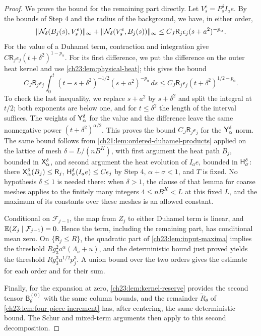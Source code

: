 \begin{proof}
We prove the bound for the remaining part directly. Let $V_s^e=P_s^\delta I_ae$. By the bounds of Step 4 and the radius of the background, we have, in either order,
\[
 \lVert \mathcal N_\delta(B_j(s),V_s^e)\rVert_\infty+\lVert \mathcal N_\delta(V_s^e,B_j(s))\rVert_\infty\le C_J\mathsf R_j\epsilon_j(s+a^2)^{-p_\alpha}.
\]
For the value of a Duhamel term, contraction and integration give $C\mathsf R_j\epsilon_j(t+\delta^2)^{1-p_\alpha}$. For its first difference, we put the difference on the outer heat kernel and use \cref{ch23:lem:physical-heat}; this gives the bound
\[
 C_J\mathsf R_j\epsilon_j\int_0^t(t-s+\delta^2)^{-1/2}(s+a^2)^{-p_\alpha}\,ds\le C_J\mathsf R_j\epsilon_j(t+\delta^2)^{1/2-p_\alpha}.
\]
To check the last inequality, we replace $s+a^2$ by $s+\delta^2$ and split the integral at $t/2$; both exponents are below one, and for $t\le\delta^2$ the length of the interval suffices. The weights of $\mathsf Y_{\alpha}^{\delta}$ for the value and the difference leave the same nonnegative power $(t+\delta^2)^{\alpha/2}$. This proves the bound $C_J\mathsf R_j\epsilon_j$ for the $\mathsf Y_{\alpha}^{\delta}$ norm. The same bound follows from \cref{ch21:lem:ordered-duhamel-products} applied on the lattice of mesh $\delta=L/(nB^K)$, with first argument the heat path $B_j$, bounded in $\mathsf X_{\alpha}^{\delta}$, and second argument the heat evolution of $I_ae$, bounded in $\mathsf H_{\sigma}^{\delta}$: there $\mathsf X_{\alpha}^{\delta}(B_j)\le\mathsf R_j$, $\mathsf H_{\sigma}^{\delta}(I_ae)\le C\epsilon_j$ by Step 4, $\alpha+\sigma<1$, and $T$ is fixed. No hypothesis $\delta\le1$ is needed there: when $\delta>1$, the clause of that lemma for coarse meshes applies to the finitely many integers $4\le nB^K<L$ at this fixed $L$, and the maximum of its constants over these meshes is an allowed constant.

Conditional on $\mathcal F_{j-1}$, the map from $Z_j$ to either Duhamel term is linear, and $\mathbb E(Z_j\mid\mathcal F_{j-1})=0$. Hence the term, including the remaining part, has conditional mean zero. On $\{\mathsf R_j\le R\}$, the quadratic part of \cref{ch23:lem:input-maxima} implies the threshold $Rg_3^2a^\alpha(\Lambda_a+u)$, and the deterministic bound just proved yields the threshold $Rg_3^3a^{1/2}p_j^3$. A union bound over the two orders gives the estimate for each order and for their sum.

Finally, for the expansion at zero, \cref{ch23:lem:kernel-reserve} provides the second tensor $\mathsf B_\theta^{(0)}$ with the same column bounds, and the remainder $\widetilde R_\theta$ of \cref{ch23:lem:four-piece-increment} has, after centering, the same deterministic bound. The Schur and mixed-term arguments then apply to this second decomposition.
\end{proof}

